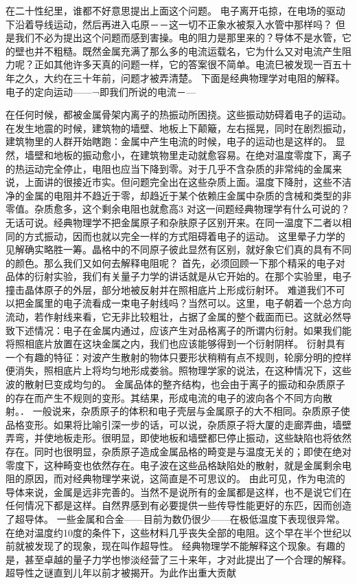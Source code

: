 在二十性纪里，谁都不好意思提出上面这个问题。
电子离开屯掠，在电场的驱动下沿着导线运动，然后再进入屯原－－这一切不正象水被泵入水管中那样吗？
但是我们不必为提出这个问题而感到害操。电的阻力是那里来的？导体不是水管，它的壁也并不粗糙。既然金属充满了那么多的电流运载名，它为什么又对电流产生阻力呢？正如其他许多天真的问题一样，它的答案很不简单。电流巳被发现一百五十年之久，大约在三十年前，问题才被弄清楚。
下面是经典物理学对电阻的解释。电子的定向运动——¬即我们所说的电流－—{在任何时候，都被金属骨架内离子的热振动所困挠。这些振动妨碍着电子的运动。在发生地震的时候，建筑物的墙壁、地板上下颠簸，左右摇晃，同时在剧烈振动，建筑物里的人群开始瞎跑：金属中产生电流的时候，电子的运动也是这样的。
显然，墙壁和地板的振动愈小，在建筑物里走动就愈容易。在绝对温度零度下，离子的热运动完全停止，电阻也应当下降到零。对于几乎不含杂质的非常纯的金属来说，上面讲的很接近市实。但问题完全出在这些杂质上面。温度下降肘，这些不洁净的金属的电阻并不趋近于零，却趋近于某个依赖庄金属中杂质的含械和类型的非零值。杂质愈多，这个剩余电阻也就愈高3
对这一间题经典物理学有什么可说的？无话可说。经典物理学不把金属原子和杂肤原子区别开来。在同一温度下二者以相同的方式振动，因而也就以完全一样的方式阻碍着电子的运动。
这里晕子力学的见解确实略胜一筹。晶格中的不同原子彼此显然有区别，就好象它们真的具有不同的颜色。那么我们又如何去解释电阻呢？
首先，必须回顾一下那个精采的电子对品体的衍射实验，我们有关量子力学的讲话就是从它开始的。在那个实验里，电子撞击晶体原子的外层，部分地被反射并在照相底片上形成衍射环。
难道我们不可以把金属里的电子流看成一束电子射线吗？当然可以。这里，电子朝着一个总方向流动，若作射线来看，它无非比较粗壮，占据了金属的整个截面而已。这就必然导致下述情况：电子在金属内通过，应该产生对品格离子的所谓内衍射。如果我们能将照相底片放置在这块金属之内，我们也应该能够得到一个衍射阴样。
衍射具有一个有趣的特征：对波产生散射的物体只要形状稍稍有点不规则，轮廓分明的控样便消失，照相底片上将均匀地形成娄翁。照物理学家的说法，在这种情况下，这些波的散射巳变成均匀的。
金属品体的整齐结构，也会由于离子的振动和杂质原子的存在而产生不规则的变形。其结果，形成电流的电子的波向各个不同方向散射。．
一般说来，杂质原子的体积和电子壳层与金属原子的大不相同。杂质原子使品格变形。如果将比喻引深一步的话，可以说，杂质原子将大厦的走廊弄曲，墙壁弄弯，并使地板走形。很明显，即使地板和墙壁都巳停止振动，这些缺陷也将依然存在。同时也很明显，杂质原子造成金属品格的畸变是与温度无关的；即使在绝对零度下，这种畸变也依然存在。电子波在这些品格缺陷处的散射，就是金属剩余电阻的原因，而对经典物理学来说，这简直是不可思议的。
由此可见，作为电流的导体来说，金属是远非完善的。当然不是说所有的金属都是这样，也不是说它们在任何情况下都是这样。自然界感到有必要提供一些传导性能更好的东匹，因而创造了超导体。
一些金属和合金——目前为数仍很少——在极低温度下表现很异常。在绝对温度约10度的条件下，这些材料几乎丧失全部的电阻。这个早在半个世纪以前就被发现了的现象，现在叫作超导性。
经典物理学不能解释这个现象。有趣的是，甚至卓越的量子力学也惨淡经营了三十来年，才对此提出了一个合理的解释。
超导性之谜直到儿年以前才被揭开。为此作出重大贡献

}
